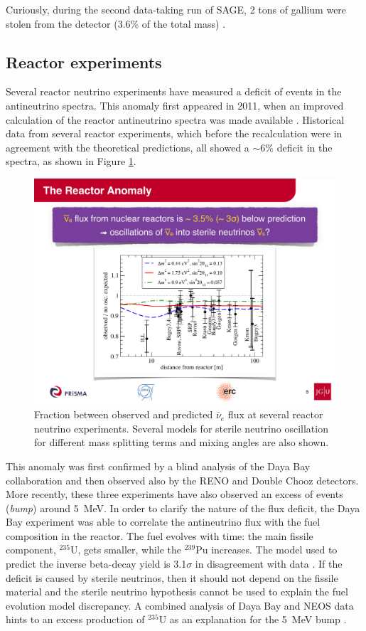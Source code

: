 Curiously, during the second data-taking run of SAGE, 2 tons of gallium were stolen from the detector (3.6\% of the total mass) \cite{Abdurashitov:1999zd}.
    
\subsection{Reactor experiments} 
Several reactor neutrino experiments have measured a deficit of events in the antineutrino spectra. This anomaly first appeared in 2011, when an improved calculation of the reactor antineutrino spectra was made available \cite{Mueller:2011nm}. Historical data from several reactor experiments, which before the recalculation were in agreement with the theoretical predictions, all showed a $\sim6\%$ deficit in the spectra, as shown in Figure \ref{fig:reactor}. 
    
    \begin{figure}[htbp]
      \centering
      \captionsetup{margin=1.3cm}
      \includegraphics[width=0.75\linewidth]{figures/reactor.pdf}
      \caption{Fraction between observed and predicted $\bar{\nu}_{e}$ flux at several reactor neutrino experiments. Several models for sterile neutrino oscillation for different mass splitting terms and mixing angles are also shown.}
    \label{fig:reactor}
    \end{figure}
    
    This anomaly was first confirmed by a blind analysis of the Daya Bay collaboration \cite{An:2015nua} and then observed also by the RENO and Double Chooz detectors. More recently, these three experiments have also observed an excess of events (\emph{bump}) around 5~MeV. 
    In order to clarify the nature of the flux deficit, the Daya Bay experiment was able to correlate the antineutrino flux with the fuel composition in the reactor. The fuel evolves with time: the main fissile component, $^{235}$U, gets smaller, while the $^{239}$Pu increases. The model used to predict the inverse beta-decay yield is 3.1$\sigma$ in disagreement with data \cite{An:2017osx}. If the deficit is caused by sterile neutrinos, then it should not depend on the fissile material and the sterile neutrino hypothesis cannot be used to explain the fuel evolution model discrepancy. A combined analysis of Daya Bay and NEOS data hints to an excess production of $^{235}$U as an explanation for the 5~MeV bump \cite{Huber:2016xis}. 
    
